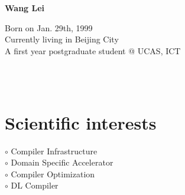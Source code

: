 \documentclass[a4paper,10pt]{article}
\begin{document}
\thispagestyle{empty}

\begin{adjustbox}{valign=t}
\begin{minipage}{0.3\textwidth} %
\begin{center}

\MySkip 	%

{\LARGE \bfseries Wang Lei}

\MySkip 	%

Born on Jan. 29th, 1999\\

Currently living in Beijing City\\

A first year postgraduate student @ UCAS, ICT

\MySkip 	%

\textcolor{ColorTwo}{\faGithub} 
 \\


\textcolor{ColorTwo}{\faChain} 
 \\

\textcolor{ColorTwo}{\faEnvelopeO} 

\end{center}

\vfill

\section*{Scientific interests}
\raggedright
\textcolor{ColorOne}{$\circ$} Compiler Infrastructure \\
\textcolor{ColorOne}{$\circ$} Domain Specific Accelerator \\
\textcolor{ColorOne}{$\circ$} Compiler Optimization\\
\textcolor{ColorOne}{$\circ$} DL Compiler


\end{minipage}
\end{adjustbox}
\end{document}
